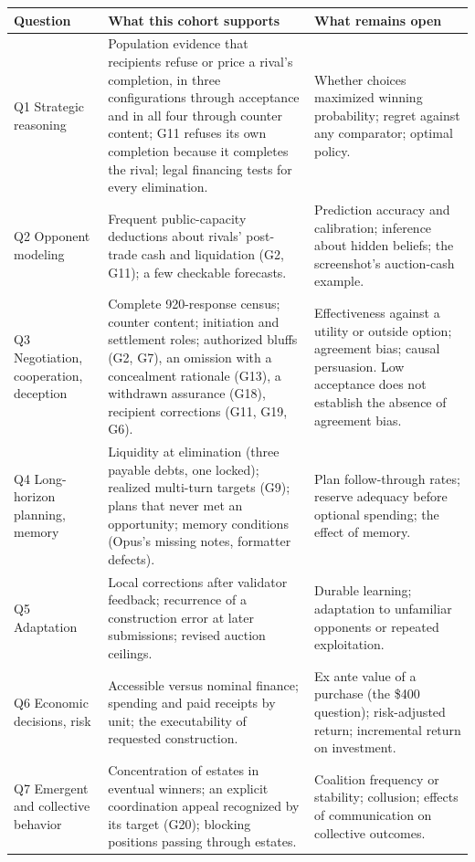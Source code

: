 \begin{table}[p]
\centering\small
\begin{tabularx}{\linewidth}{@{}L{2.6cm}YY@{}}
\toprule
Question & What this cohort supports & What remains open\\
\midrule
Q1 Strategic reasoning & Population evidence that recipients refuse or price a rival's completion, in three configurations through acceptance and in all four through counter content; G11 refuses its own completion because it completes the rival; legal financing tests for every elimination. & Whether choices maximized winning probability; regret against any comparator; optimal policy.\\
Q2 Opponent modeling & Frequent public-capacity deductions about rivals' post-trade cash and liquidation (G2, G11); a few checkable forecasts. & Prediction accuracy and calibration; inference about hidden beliefs; the screenshot's auction-cash example.\\
Q3 Negotiation, cooperation, deception & Complete 920-response census; counter content; initiation and settlement roles; authorized bluffs (G2, G7), an omission with a concealment rationale (G13), a withdrawn assurance (G18), recipient corrections (G11, G19, G6). & Effectiveness against a utility or outside option; agreement bias; causal persuasion. Low acceptance does not establish the absence of agreement bias.\\
Q4 Long-horizon planning, memory & Liquidity at elimination (three payable debts, one locked); realized multi-turn targets (G9); plans that never met an opportunity; memory conditions (Opus's missing notes, formatter defects). & Plan follow-through rates; reserve adequacy before optional spending; the effect of memory.\\
Q5 Adaptation & Local corrections after validator feedback; recurrence of a construction error at later submissions; revised auction ceilings. & Durable learning; adaptation to unfamiliar opponents or repeated exploitation.\\
Q6 Economic decisions, risk & Accessible versus nominal finance; spending and paid receipts by unit; the executability of requested construction. & Ex ante value of a purchase (the \$400 question); risk-adjusted return; incremental return on investment.\\
Q7 Emergent and collective behavior & Concentration of estates in eventual winners; an explicit coordination appeal recognized by its target (G20); blocking positions passing through estates. & Coalition frequency or stability; collusion; effects of communication on collective outcomes.\\

\end{tabularx}
\end{table}
